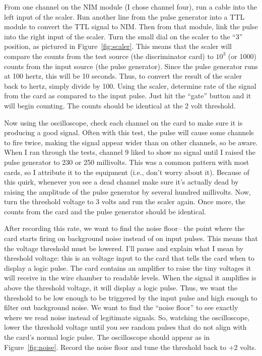 \documentclass[final]{report}
\begin{document}
From one channel on the NIM module (I chose channel four), run a cable into the left input of the scaler. Run another line from the pulse generator into a TTL module to convert the TTL signal to NIM. Then from that module, link the pulse into the right input of the scaler. Turn the small dial on the scaler to the ``3'' position, as pictured in Figure~\ref{fig:scaler}. This means that the scaler will compare the counts from the test source (the discriminator card) to $10^3$ (or 1000) counts from the input source (the pulse generator). Since the pulse generator runs at 100 hertz, this will be 10 seconds. Thus, to convert the result of the scaler back to hertz, simply divide by 100. Using the scaler, determine rate of the signal from the card as compared to the input pulse. Just hit the ``gate'' button and it will begin counting. The counts should be identical at the 2 volt threshold. 

Now using the oscilloscope, check each channel on the card to make sure it is producing a good signal. Often with this test, the pulse will cause some channels to fire twice, making the signal appear wider than on other channels, so be aware. When I ran through the tests, channel 9 liked to show no signal until I raised the pulse generator to 230 or 250 millivolts. This was a common pattern with most cards, so I attribute it to the equipment (i.e., don't worry about it). Because of this quirk, whenever you see a dead channel make sure it's actually dead by raising the amplitude of the pulse generator by several hundred millivolts. Now, turn the threshold voltage to 3 volts and run the scaler again. Once more, the counts from the card and the pulse generator should be identical.

After recording this rate, we want to find the noise floor-- the point where the card starts firing on background noise instead of on input pulses. This means that the voltage threshold must be lowered. I'll pause and explain what I mean by threshold voltage: this is an voltage input to the card that tells the card when to display a logic pulse. The card contains an amplifier to raise the tiny voltages it will receive in the wire chamber to readable levels. When the signal it amplifies is above the threshold voltage, it will display a logic pulse. Thus, we want the threshold to be low enough to be triggered by the input pulse and high enough to filter out background noise. We want to find the ``noise floor'' to see exactly where we read noise instead of legitimate signals. So, watching the oscilloscope, lower the threshold voltage until you see random pulses that do not align with the card's normal logic pulse. The oscilloscope should appear as in Figure~\ref{fig:noise}. Record the noise floor and tune the threshold back to +2 volts. 
\end{document}
